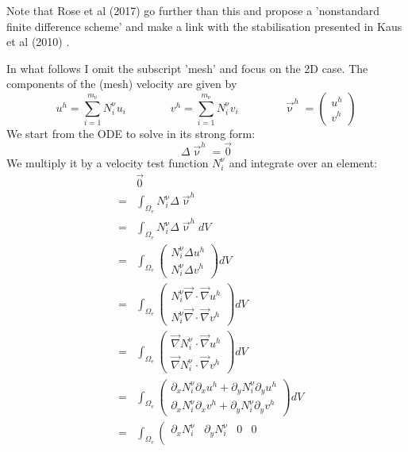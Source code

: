 Note that Rose et al (2017) \cite{robh17} go further than this and propose a 'nonstandard finite difference scheme' and make a link with the stabilisation presented in Kaus et al (2010) \cite{kamm10}.

In what follows I omit the subscript 'mesh' and focus on the 2D case. The components of the (mesh) velocity
are given by
\[
u^h = \sum_{i=1}^{m_\upnu} N_i^\upnu u_i
\qquad
\qquad
v^h = \sum_{i=1}^{m_\upnu} N_i^\upnu v_i
\qquad
\qquad
\vec{\upnu}^h=\left( 
\begin{array}{c}
u^h \\
v^h 
\end{array}  \right)
\]
We start from the ODE to solve in its strong form:
\[
\Delta \vec{\upnu}^h = \vec{0}
\]
We multiply it by a velocity test function $N_i^\upnu$ and integrate over an element: 
\begin{eqnarray}
&&\vec 0 \nonumber\\
&=& \int_{\Omega_e} N_i^\upnu  \Delta \vec{\upnu}^h \nonumber\\ 
&=&\int_{\Omega_e} N_i^\upnu \Delta \vec\upnu^h dV \nonumber\\
&=&\int_{\Omega_e}  \left(\begin{array}{c}
N_i^\upnu \Delta u^h \\
N_i^\upnu \Delta v^h 
\end{array}\right) dV \nonumber\\
&=&\int_{\Omega_e}  \left(\begin{array}{c}
N_i^\upnu \vec\nabla \cdot \vec\nabla u^h \\
N_i^\upnu \vec\nabla \cdot \vec\nabla v^h 
\end{array}\right) dV \nonumber\\
&=&
\int_{\Omega_e}   \left(\begin{array}{c}
\vec\nabla N_i^\upnu \cdot \vec\nabla u^h \\
\vec\nabla N_i^\upnu \cdot \vec\nabla v^h 
\end{array}\right) dV \nonumber\\
&=&
\int_{\Omega_e}
\left(\begin{array}{c}
\partial_x N_i^\upnu \partial_x u^h + \partial_y N_i^\upnu \partial_y u^h \\ 
\partial_x N_i^\upnu \partial_x v^h + \partial_y N_i^\upnu \partial_y v^h 
\end{array}\right) dV \nonumber\\
&=&\int_{\Omega_e}
\left(
\begin{array}{cccc}
\partial_x N_i^\upnu & \partial_y N_i^\upnu & 0 & 0 \\ 

\end{array}
\end{eqnarray}
